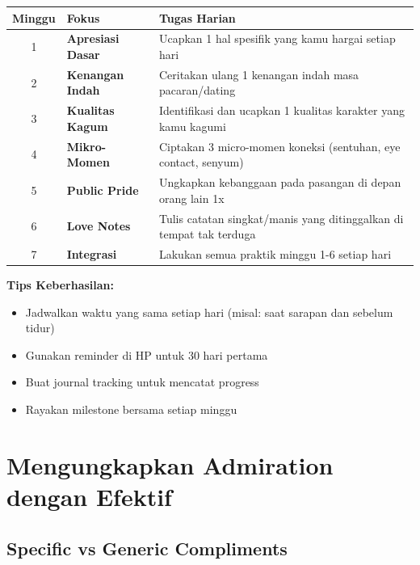 \begin{exercisebox}
\renewcommand{\arraystretch}{1.6}
\begin{tabular}{|c|>{\raggedright}p{4cm}|>{\raggedright\arraybackslash}p{7cm}|}
\hline
\rowcolor{primary!20}
\textbf{Minggu} & \textbf{Fokus} & \textbf{Tugas Harian} \\
\hline
1 & \textbf{Apresiasi Dasar} & Ucapkan 1 hal spesifik yang kamu hargai setiap hari \\
\hline
2 & \textbf{Kenangan Indah} & Ceritakan ulang 1 kenangan indah masa pacaran/dating \\
\hline
3 & \textbf{Kualitas Kagum} & Identifikasi dan ucapkan 1 kualitas karakter yang kamu kagumi \\
\hline
4 & \textbf{Mikro-Momen} & Ciptakan 3 micro-momen koneksi (sentuhan, eye contact, senyum) \\
\hline
5 & \textbf{Public Pride} & Ungkapkan kebanggaan pada pasangan di depan orang lain 1x \\
\hline
6 & \textbf{Love Notes} & Tulis catatan singkat/manis yang ditinggalkan di tempat tak terduga \\
\hline
7 & \textbf{Integrasi} & Lakukan semua praktik minggu 1-6 setiap hari \\
\hline
\end{tabular}

\vspace{0.5cm}
\textbf{Tips Keberhasilan:}
\begin{itemize}
    \item Jadwalkan waktu yang sama setiap hari (misal: saat sarapan dan sebelum tidur)
    \item Gunakan reminder di HP untuk 30 hari pertama
    \item Buat journal tracking untuk mencatat progress
    \item Rayakan milestone bersama setiap minggu
\end{itemize}
\end{exercisebox}

\section{Mengungkapkan Admiration dengan Efektif}

\subsection{Specific vs Generic Compliments}

